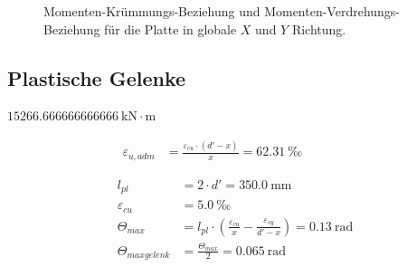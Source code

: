 \documentclass[
  11pt,
  letterpaper,
]{scrreprt}
\begin{document}
\begin{figure}[H]

\begin{minipage}{0.50\linewidth}



\end{minipage}%
%
\begin{minipage}{0.50\linewidth}



\end{minipage}%

\caption{\label{fig-tho_biegung}Momenten-Krümmungs-Beziehung und
Momenten-Verdrehungs-Beziehung für die Platte in globale \(X\) und \(Y\)
Richtung.}

\end{figure}%

\subsection{Plastische Gelenke}\label{plastische-gelenke}

$15266.666666666666\ \mathrm{kN} \cdot \mathrm{m}$

\[
\begin{aligned}
\varepsilon_{u , adm}& = \frac{\varepsilon_{cu} \cdot \left({d}' - x\right)}{x} = 62.31 \ \mathrm{‰} \quad &  \quad &  
 \end{aligned}
\]

\[
\begin{aligned}
l_{pl}& = 2 \cdot {d}' = 350.0 \ \mathrm{mm} \\ 
\varepsilon_{cu}& = 5.0 \ \mathrm{‰} \\ 
\Theta_{max}& = l_{pl} \cdot \left(\frac{\varepsilon_{cu}}{x} - \frac{\varepsilon_{sy}}{{d}' - x}\right) = 0.13 \ \mathrm{rad} \\ 
\Theta_{max gelenk}& = \frac{\Theta_{max}}{2} = 0.065 \ \mathrm{rad} \end{aligned}
\]
\end{document}
